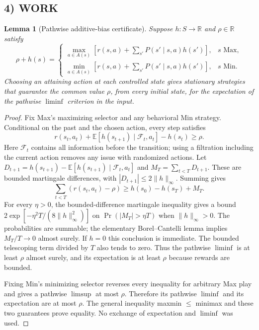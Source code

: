 \documentclass[11pt,a4paper]{article}
\newtheorem{lemma}[theorem]{Lemma}
\theoremstyle{definition}
\theoremstyle{remark}
\begin{document}
\subsection*{4) WORK}
\begin{lemma}[Pathwise additive-bias certificate]
Suppose $h:S\to\mathbb R$ and $\rho\in\mathbb R$ satisfy
\[
 \rho+h(s)=
 \begin{cases}
 \max_{a\in A(s)}[r(s,a)+\sum_{s'}P(s'\mid s,a)h(s')],&s\text{ Max},\\
 \min_{a\in A(s)}[r(s,a)+\sum_{s'}P(s'\mid s,a)h(s')],&s\text{ Min}.
 \end{cases}
\]
Choosing an attaining action at each controlled state gives stationary strategies that guarantee the common value $\rho$, from every initial state, for the expectation of the pathwise $\liminf$ criterion in the input.
\end{lemma}
\begin{proof}
Fix Max's maximizing selector and any behavioral Min strategy. Conditional on the past and the chosen action, every step satisfies
\[
 r(s_t,a_t)+\mathbb E[h(s_{t+1})\mid\mathcal F_t,a_t]-h(s_t)\geq\rho.
\]
Here $\mathcal F_t$ contains all information before the transition; using a filtration including the current action removes any issue with randomized actions. Let
$D_{t+1}=h(s_{t+1})-\mathbb E[h(s_{t+1})\mid\mathcal F_t,a_t]$ and $M_T=\sum_{t<T}D_{t+1}$. These are bounded martingale differences, with $|D_{t+1}|\leq2\|h\|_\infty$. Summing gives
\[
 \sum_{t<T}(r(s_t,a_t)-\rho)
 \geq h(s_0)-h(s_T)+M_T.
\]
For every $\eta>0$, the bounded-difference martingale inequality gives a bound $2\exp[-\eta^2T/(8\|h\|_\infty^2)]$ on $\Pr(|M_T|>\eta T)$ when $\|h\|_\infty>0$. The probabilities are summable; the elementary Borel--Cantelli lemma implies $M_T/T\to0$ almost surely. If $h=0$ this conclusion is immediate. The bounded telescoping term divided by $T$ also tends to zero. Thus the pathwise $\liminf$ is at least $\rho$ almost surely, and its expectation is at least $\rho$ because rewards are bounded.

Fixing Min's minimizing selector reverses every inequality for arbitrary Max play and gives a pathwise $\limsup$ at most $\rho$. Therefore its pathwise $\liminf$ and its expectation are at most $\rho$. The general inequality maxmin $\leq$ minimax and these two guarantees prove equality. No exchange of expectation and $\liminf$ was used.
\end{proof}
\end{document}
